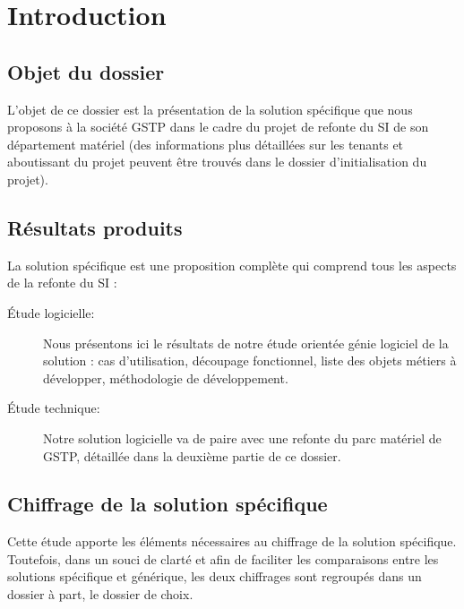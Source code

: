 \section{Introduction}


\subsection{Objet du dossier}

L'objet de ce dossier est la présentation de la solution spécifique que
nous proposons à la société GSTP dans le cadre du projet de refonte du SI
de son département matériel (des informations plus détaillées sur les
tenants et aboutissant du projet peuvent être trouvés dans le dossier
d'initialisation du projet).


\subsection{Résultats produits}

La solution spécifique est une proposition complète qui comprend tous les
aspects de la refonte du SI :

\begin{description}

\item[Étude logicielle:]\el
Nous présentons ici le résultats de notre étude orientée génie logiciel de
la solution : cas d'utilisation, découpage fonctionnel, liste des objets
métiers à développer, méthodologie de développement.

\item[Étude technique:]\el
Notre solution logicielle va de paire avec une refonte du parc matériel de
GSTP, détaillée dans la deuxième partie de ce dossier.

\end{description}

\subsection{Chiffrage de la solution spécifique}

Cette étude apporte les éléments nécessaires au chiffrage de la solution
spécifique. Toutefois, dans un souci de clarté et afin de faciliter les
comparaisons entre les solutions spécifique et générique, les deux
chiffrages sont regroupés dans un dossier à part, le dossier de choix.
